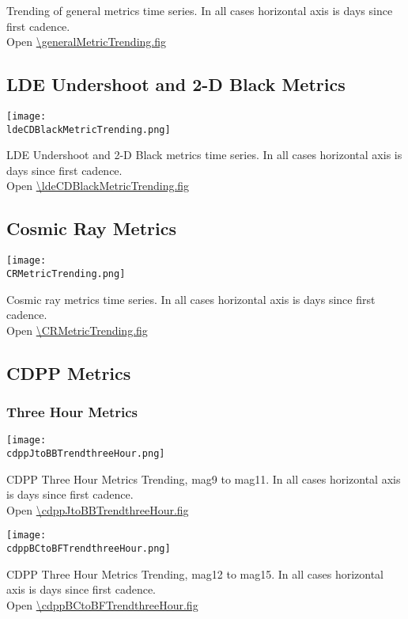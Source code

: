 Trending of general metrics time series. In all cases horizontal axis
is days since first cadence.\\
Open \url{\generalMetricTrending.fig}

\clearpage
\subsection{LDE Undershoot and 2-D Black Metrics}

\begin{center}
\texttt{[image: \\ldeCDBlackMetricTrending.png]}
\end{center}
LDE Undershoot and 2-D Black metrics time series. In all cases
horizontal axis is days since first cadence.\\
Open \url{\ldeCDBlackMetricTrending.fig}

\clearpage
\subsection{Cosmic Ray Metrics}

\begin{center}
\texttt{[image: \\CRMetricTrending.png]}
\end{center}
Cosmic ray metrics time series. In all cases horizontal axis is days
since first cadence.\\ 
Open \url{\CRMetricTrending.fig}

\clearpage
\subsection{CDPP Metrics}

\subsubsection{Three Hour Metrics}

\begin{center}
\texttt{[image: \\cdppJtoBBTrendthreeHour.png]}
\end{center}
CDPP Three Hour Metrics Trending, mag9 to mag11. In all cases
horizontal axis is days since first cadence.\\
Open \url{\cdppJtoBBTrendthreeHour.fig}

\clearpage
\begin{center}
\texttt{[image: \\cdppBCtoBFTrendthreeHour.png]}
\end{center}
CDPP Three Hour Metrics Trending, mag12 to mag15. In all cases
horizontal axis is days since first cadence.\\
Open \url{\cdppBCtoBFTrendthreeHour.fig}

